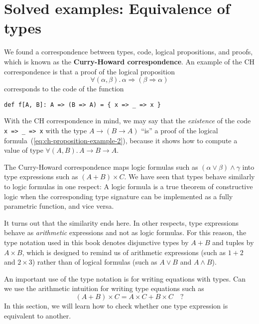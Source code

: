 \section{Solved examples: Equivalence of types}

We found a correspondence between types, code, logical propositions,
and proofs, which is known as the \textbf{Curry-Howard correspondence}.
An example of the CH correspondence is that a proof of the logical
proposition
\begin{equation}
\forall(\alpha,\beta).\,\alpha\Rightarrow\left(\beta\Rightarrow\alpha\right)\label{eq:ch-proposition-example-2}
\end{equation}
corresponds to the code of the function 
\begin{lstlisting}
def f[A, B]: A => (B => A) = { x => _ => x }
\end{lstlisting}
With the CH correspondence in mind, we may say that the \emph{existence}
of the code \lstinline!x => _ => x! with the type $A\rightarrow(B\rightarrow A)$
\textsf{``}is\textsf{''} a proof of the logical formula~(\ref{eq:ch-proposition-example-2}),
because it shows how to compute a value of type $\forall(A,B).\,A\rightarrow B\rightarrow A$.

The Curry-Howard correspondence maps logic formulas such as $(\alpha\vee\beta)\wedge\gamma$
into type expressions such as $\left(A+B\right)\times C$. We have
seen that types behave similarly to logic formulas in one respect:
A logic formula is a true theorem of constructive logic when the corresponding
type signature can be implemented as a fully parametric function,
and vice versa.

It turns out that the similarity ends here. In other respects, type
expressions behave as \emph{arithmetic} expressions and not as logic
formulas. For this reason, the type notation used in this book denotes
disjunctive types by $A+B$ and tuples by $A\times B$, which is designed
to remind us of arithmetic expressions (such as $1+2$ and $2\times3$)
rather than of logical formulas (such as $A\vee B$ and $A\wedge B$). 

An important use of the type notation is for writing equations with
types. Can we use the arithmetic intuition for writing type equations
such as 
\begin{equation}
\left(A+B\right)\times C=A\times C+B\times C\quad?\label{eq:ch-example-distributive}
\end{equation}
In this section, we will learn how to check whether one type expression
is equivalent to another.

